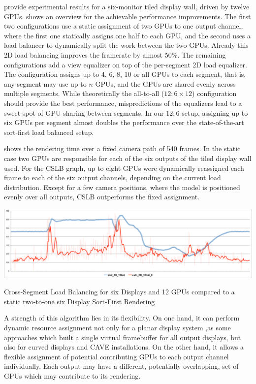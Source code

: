 \cite{EEP:11} provide experimental results for a six-monitor tiled display wall,
driven by twelve GPUs.  shows an overview for the achievable
performance improvements. The first two configurations use a static assignment
of two GPUs to one output channel, where the first one statically assigns one
half to each GPU, and the second uses a load balancer to dynamically split the
work between the two GPUs. Already this 2D load balancing improves the
framerate by almost 50\%. The remaining configurations add a view equalizer on
top of the per-segment 2D load equalizer. The configuration assigns up to 4, 6,
8, 10 or all GPUs to each segment, that is, any segment may use up to $n$ GPUs,
and the GPUs are shared evenly across multiple segments. While theoretically
the all-to-all ($12:6\times 12$) configuration should provide the best
performance, mispredictions of the equalizers lead to a sweet spot of GPU
sharing between segments. In our $12:6$ setup, assigning up to six GPUs per
segment almost doubles the performance over the state-of-the-art sort-first
load balanced setup.

 shows the rendering time over a fixed camera path of 540 frames.
In the static case two GPUs are responsible for each of the six outputs of the
tiled display wall used. For the CSLB graph, up to eight GPUs were dynamically
reassigned each frame to each of the six output channels, depending on the
current load distribution. Except for a few camera positions, where the model is
positioned evenly over all outputs, CSLB outperforms the fixed assignment.

\begin{benchmark}[h!t]
  \centering
  \includegraphics[width=\textwidth]{results/cslb}
  \caption{Cross-Segment Load Balancing for six Displays and 12 GPUs compared to a static two-to-one six Display Sort-First Rendering}
  \label{rCSLB}
\end{benchmark}

A strength of this algorithm lies in its flexibility. On one hand, it can
perform dynamic resource assignment not only for a planar display system ,as
some approaches which built a single virtual framebuffer for all output
displays, but also for curved displays and CAVE installations. On the other
hand, it allows a flexible assignment of potential contributing GPUs to each
output channel individually. Each output may have a different,
potentially overlapping, set of GPUs which may contribute to its rendering.

